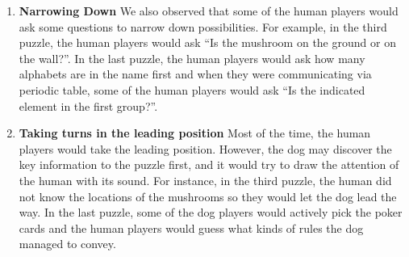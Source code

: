 \documentclass{sigchi}
\begin{document}
\begin{enumerate}
\item \textbf{Narrowing Down}\newline
We also observed that some of the human players would ask some questions to narrow down possibilities.
For example, in the third puzzle, the human players would ask ``Is the mushroom on the ground or on the wall?''.
In the last puzzle, the human players would ask how many alphabets are in the name first and when they were communicating via periodic table, some of the human players would ask ``Is the indicated element in the first group?''.

\item \textbf{Taking turns in the leading position}\newline
Most of the time, the human players would take the leading position.
However, the dog may discover the key information to the puzzle first, and it would try to draw the attention of the human with its sound.
For instance, in the third puzzle, the human did not know the locations of the mushrooms so they would let the dog lead the way.
In the last puzzle, some of the dog players would actively pick the poker cards and the human players would guess what kinds of rules the dog managed to convey.


\end{enumerate}
\end{document}
